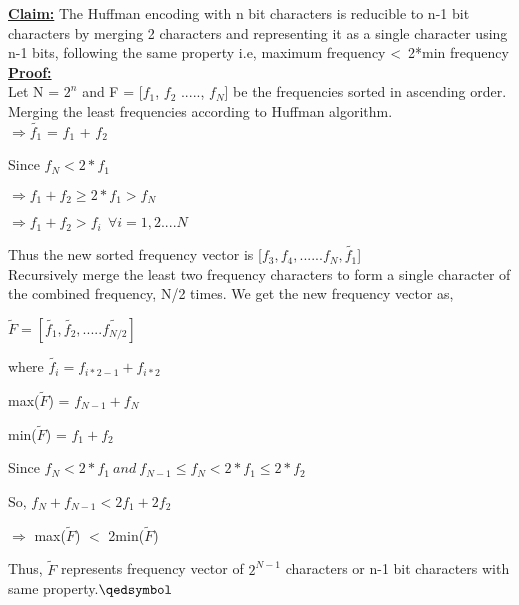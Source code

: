 \documentclass[a4paper]{article}
\begin{document}
\begin{enumerate}[(a)]
     \underline{\textbf{Claim:}} The Huffman encoding with n bit characters is reducible to n-1 bit characters by merging 2 characters and representing it as a single character using n-1 bits, following the same property i.e, maximum frequency \textless \ 2*min frequency\\
     
     \underline{\textbf{Proof:}}\\
     Let N = $2^n$ and F = [$f_1$, $f_2$ ....., $f_N$] be the frequencies sorted in ascending order.\\
     Merging the least frequencies according to Huffman algorithm.\\
     
     $\Rightarrow \tilde{f_1}$ = $f_1$ + $f_2$\\
     {Since $f_N < 2*f_1 $\par}
     {\hspace{10mm} $\Rightarrow f_1 + f_2 \geq 2*f_1 > f_N$ \par}
     {\hspace{10mm} $\Rightarrow f_1 + f_2 > f_i \ \ \forall i = 1, 2.... N$ \par}
     {Thus the new sorted frequency vector is [$f_3, f_4,......f_N, \tilde{f_1}$]\\
     Recursively merge the least two frequency characters to form a single character of the combined frequency, N/2 times. We get the new frequency vector as,\par}
    {\hspace{10mm} $\tilde{F} = [\tilde{f_1}, \tilde{f_2},.....\tilde{f_{N/2}}]$\par}
    {\hspace{10mm} where $\tilde{f_i} = f_{i*2-1} + f_{i*2}$\par}
    {\hspace{10mm} max($\tilde{F}$) = $f_{N-1} + f_N$ \par}
    {\hspace{10mm} min($\tilde{F}$) = $f_{1} + f_2$ \par}
    {\hspace{10mm} Since $f_N < 2*f_1 \ and \ f_{N-1} \leq f_N < 2*f_1 \leq 2*f_2$\par}
    {\hspace{10mm} So, $f_N + f_{N-1} < 2f_1 + 2f_2$ \par}
    {\hspace{10mm} $\Rightarrow$ max($\tilde{F}$)  $<$ 2min($\tilde{F}$) \par }
Thus, $\tilde{F}$ represents frequency vector of $2^{N-1}$ characters or n-1 bit characters with same property.{\hfill$\qedsymbol$}\\


\end{enumerate}
\end{document}
